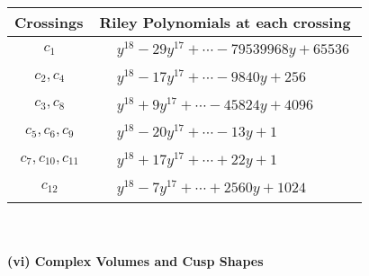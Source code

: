 \documentclass[1p]{elsarticle_modified}
\theoremstyle{definition}
\begin{document}
\begin{tabular}{m{50pt}|m{274pt}}
Crossings & \hspace{64pt}Riley Polynomials at each crossing \\
\hline $$\begin{aligned}c_{1}\end{aligned}$$&$\begin{aligned}
&y^{18}-29 y^{17}+\cdots-79539968 y+65536
\end{aligned}$\\
\hline $$\begin{aligned}c_{2},c_{4}\end{aligned}$$&$\begin{aligned}
&y^{18}-17 y^{17}+\cdots-9840 y+256
\end{aligned}$\\
\hline $$\begin{aligned}c_{3},c_{8}\end{aligned}$$&$\begin{aligned}
&y^{18}+9 y^{17}+\cdots-45824 y+4096
\end{aligned}$\\
\hline $$\begin{aligned}c_{5},c_{6},c_{9}\end{aligned}$$&$\begin{aligned}
&y^{18}-20 y^{17}+\cdots-13 y+1
\end{aligned}$\\
\hline $$\begin{aligned}c_{7},c_{10},c_{11}\end{aligned}$$&$\begin{aligned}
&y^{18}+17 y^{17}+\cdots+22 y+1
\end{aligned}$\\
\hline $$\begin{aligned}c_{12}\end{aligned}$$&$\begin{aligned}
&y^{18}-7 y^{17}+\cdots+2560 y+1024
\end{aligned}$\\
\hline
\end{tabular}\\~\\
\newpage\flushleft \textbf{(vi) Complex Volumes and Cusp Shapes}
\end{document}
